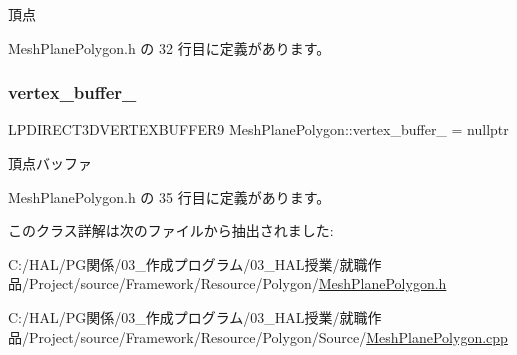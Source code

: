 頂点 



 Mesh\+Plane\+Polygon.\+h の 32 行目に定義があります。

\mbox{\label{class_mesh_plane_polygon_a71ae2d4bea783da57a1b0ec4f6a53971}} 
\subsubsection{\texorpdfstring{vertex\+\_\+buffer\+\_\+}{vertex\_buffer\_}}
{\footnotesize\ttfamily L\+P\+D\+I\+R\+E\+C\+T3\+D\+V\+E\+R\+T\+E\+X\+B\+U\+F\+F\+E\+R9 Mesh\+Plane\+Polygon\+::vertex\+\_\+buffer\+\_\+ = nullptr\hspace{0.3cm}{\ttfamily [private]}}



頂点バッファ 



 Mesh\+Plane\+Polygon.\+h の 35 行目に定義があります。



このクラス詳解は次のファイルから抽出されました\+:\begin{DoxyCompactItemize}
\item 
C\+:/\+H\+A\+L/\+P\+G関係/03\+\_\+作成プログラム/03\+\_\+\+H\+A\+L授業/就職作品/\+Project/source/\+Framework/\+Resource/\+Polygon/\mbox{\hyperlink{_mesh_plane_polygon_8h}{Mesh\+Plane\+Polygon.\+h}}\item 
C\+:/\+H\+A\+L/\+P\+G関係/03\+\_\+作成プログラム/03\+\_\+\+H\+A\+L授業/就職作品/\+Project/source/\+Framework/\+Resource/\+Polygon/\+Source/\mbox{\hyperlink{_mesh_plane_polygon_8cpp}{Mesh\+Plane\+Polygon.\+cpp}}\end{DoxyCompactItemize}
